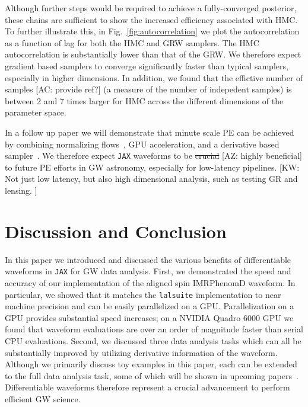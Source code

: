 \documentclass[twocolumn]{aastex631}
\newcommand{\jax}{\texttt{JAX}\xspace}
\newcommand{\lalsuite}{\texttt{lalsuite}\xspace}
\newcommand{\kw}[1]{{\color{rb4}[KW: #1 ]}}
\newcommand{\AZ}[1]{{\color{Burnt}[AZ: #1]}}
\newcommand{\amc}[1]{{\color{red}[AC: #1]}}
\begin{document}
Although further steps would be required to achieve a fully-converged posterior, these chains are sufficient to show the increased efficiency associated with HMC. 
To further illustrate this, in Fig.~\ref{fig:autocorrelation} we plot the autocorrelation as a function of lag for both the HMC and GRW samplers.
The HMC autocorrelation is substantially lower than that of the GRW.
We therefore expect gradient based samplers to converge significantly faster than typical samplers, especially in higher dimensions.
In addition, we found that the effictive number of samples 
\amc{provide ref?} 
(a measure of the number of indepedent samples) is between 2 and 7 times larger for HMC across the different dimensions of the parameter space.

In a follow up paper we will demonstrate that minute scale PE can be achieved by combining normalizing flows~\citep{2022arXiv221106397W, Gabrie:2021tlu}, GPU acceleration, and a derivative based sampler~\citep{PEpaper}. 
We therefore expect \jax waveforms to be \sout{crucial} \AZ{highly beneficial} to future PE efforts in GW astronomy, especially for low-latency pipelines.
\kw{Not just low latency, but also high dimensional analysis, such as testing GR and lensing.}

\section{Discussion and Conclusion}
\label{subsec:discussion}

In this paper we introduced and discussed the various benefits of differentiable waveforms in \jax for GW data analysis.
First, we demonstrated the speed and accuracy of our implementation of the aligned spin IMRPhenomD waveform.
In particular, we showed that it matches the \lalsuite implementation to near machine precision and can be easily parallelized on a GPU.
Parallelization on a GPU provides substantial speed increases; on a NVIDIA Quadro 6000 GPU we found that waveform evaluations are over an order of magnitude faster than serial CPU evaluations.
Second, we discussed three data analysis tasks which can all be substantially improved by utilizing derivative information of the waveform.
Although we primarily discuss toy examples in this paper, each can be extended to the full data analysis task, some of which will be shown in upcoming papers~\citep{PEpaper}.
Differentiable waveforms therefore represent a crucial advancement to perform efficient GW science.
\end{document}

